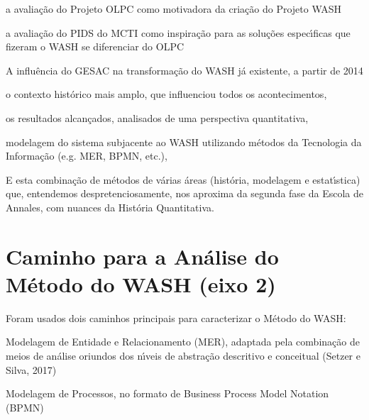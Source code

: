 \documentclass[
12pt,		%
openright,	%
twoside,  %
a4paper,			%
chapter=TITLE,		%
english,			%
french,				%
spanish,			%
brazil				%
]{USPSC-classe/USPSC}
\begin{document}
\begin{alineas}
\item a avalia\c{c}\~ao do Projeto OLPC como motivadora da cria\c{c}\~ao do Projeto WASH
\item a avalia\c{c}\~ao do PIDS do MCTI como inspira\c{c}\~ao para as solu\c{c}\~oes espec\'{\i}ficas que fizeram o WASH se diferenciar do OLPC
\item A influ\^encia do GESAC na transforma\c{c}\~ao do WASH j\'a existente, a partir de 2014
\item o contexto hist\'orico mais amplo, que influenciou todos os acontecimentos,
\item os resultados alcan\c{c}ados, analisados de uma perspectiva quantitativa,
\item modelagem do sistema subjacente ao WASH utilizando m\'etodos da Tecnologia da Informa\c{c}\~ao (e.g. MER, BPMN, etc.),
\end{alineas}

E esta combina\c{c}\~ao de m\'etodos de v\'arias \'areas (hist\'oria, modelagem e estat\'{\i}stica) que, entendemos despretenciosamente, nos aproxima da segunda fase da Escola de Annales, com nuances da Hist\'oria Quantitativa.










\section[Caminho para a An\'alise do M\'etodo do WASH (eixo 2)]{Caminho para a An\'alise do M\'etodo do WASH (eixo 2)}\label{Caminho para a An\'alise do M\'etodo do WASH (eixo 2)}
Foram usados dois caminhos principais para caracterizar o M\'etodo do WASH:











\begin{alineas}
\item Modelagem de Entidade e Relacionamento (MER), adaptada pela combina\c{c}\~ao de meios de an\'alise oriundos dos n\'{\i}veis de abstra\c{c}\~ao descritivo e conceitual (Setzer e Silva, 2017)
\item Modelagem de Processos, no formato de Business Process Model Notation (BPMN)
\end{alineas}
\end{document}
